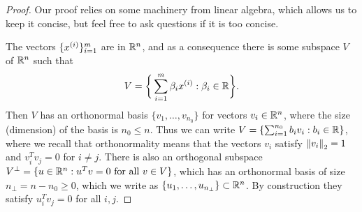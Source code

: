 \documentclass{article}
\begin{document}
\begin{proof}
  Our proof relies on some machinery from linear algebra, which allows
  us to keep it concise, but feel free to ask questions if it is
  too concise.

  The vectors $\{{x^{(i)}}\}_{i = 1}^m$ are in $\mathbb{R}^n$,
  and as a consequence there is some subspace $V$ of $\mathbb{R}^n$
  such that
  \begin{equation*}
    V = \bigg\{\sum_{i = 1}^m \beta_i {x^{(i)}} : \beta_i \in \mathbb{R}\bigg\}.
  \end{equation*}
  Then $V$ has an orthonormal basis $\{v_1, \ldots, v_{n_0}\}$ for vectors
  $v_i \in \mathbb{R}^n$, where the size (dimension) of the basis is $n_0 \le
  n$. Thus we can write $V = \{\sum_{i = 1}^{n_0} b_i v_i : b_i \in \mathbb{R}\}$,
  where we recall that orthonormality means that the vectors $v_i$ satisfy
  $\left\|{v_i}\right\|_2 = 1$ and $v_i^T v_j = 0$ for $i \neq j$.
  There is also an orthogonal subspace $V^\perp = \{u \in \mathbb{R}^n
  : u^Tv = 0 ~ \mbox{for~all~} v \in V\}$, which has an orthonormal basis
  of size $n_\perp = n - n_0 \ge 0$, which we write as
  $\{u_1, \ldots, u_{n_\perp}\} \subset \mathbb{R}^n$. By construction
  they satisfy $u_i^T v_j = 0$ for all $i, j$.


\end{proof}
\end{document}
